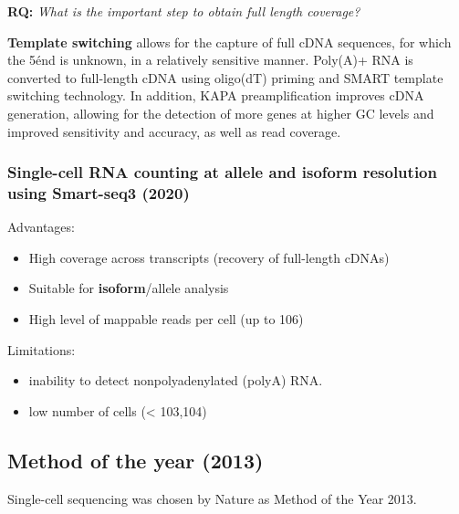 \begin{tcolorbox}
[width=\linewidth, sharp corners=all, colback=white!95!black]

\textbf{RQ: } \emph{What is the important step to obtain full length coverage?}

\textbf{Template switching} allows for the capture of full cDNA
sequences, for which the 5\' end is unknown, in a relatively sensitive
manner. Poly(A)+ RNA is converted to full-length cDNA using oligo(dT)
priming and SMART template switching technology. In addition, KAPA
preamplification improves cDNA generation, allowing for the detection of
more genes at higher GC levels and improved sensitivity and accuracy, as
well as read coverage.
\end{tcolorbox}

\hypertarget{single-cell-rna-counting-at-allele-and-isoform-resolution-using-smart-seq3-2020}{%
\subsubsection{Single-cell RNA counting at allele and isoform resolution
using Smart-seq3
(2020)}\label{single-cell-rna-counting-at-allele-and-isoform-resolution-using-smart-seq3-2020}}

Advantages:

\begin{itemize}
\tightlist
\item
  High coverage across transcripts (recovery of full-length cDNAs)
\item
  Suitable for \textbf{isoform}/allele analysis
\item
  High level of mappable reads per cell (up to 106)
\end{itemize}

Limitations:

\begin{itemize}
\tightlist
\item
  inability to detect nonpolyadenylated (polyA) RNA.
\item
  low number of cells (\textless{} 103,104)
\end{itemize}

\hypertarget{method-of-the-year-2013}{%
\subsection{Method of the year (2013)}\label{method-of-the-year-2013}}

Single-cell sequencing was chosen by Nature as Method of the Year 2013.

